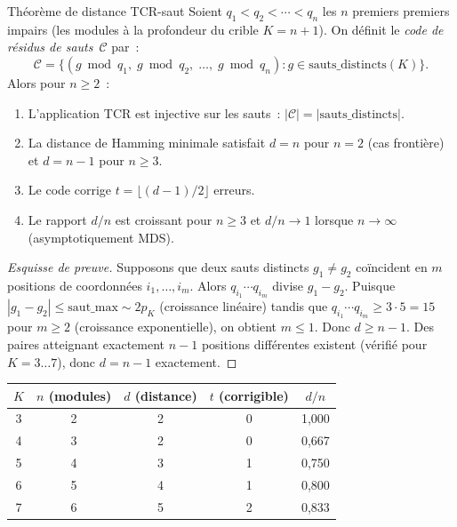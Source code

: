 \documentclass[12pt,a4paper]{article}
\begin{document}
\begin{thmbox}{Théorème de distance TCR-saut}
\label{thm:gap_distance}
Soient $q_1 < q_2 < \cdots < q_n$ les $n$ premiers premiers impairs
(les modules à la profondeur du crible $K = n+1$). On définit le
\emph{code de résidus de sauts}~$\mathcal{C}$ par~:
\[
  \mathcal{C} = \bigl\{
    (g \bmod q_1,\; g \bmod q_2,\; \ldots,\; g \bmod q_n)
    : g \in \mathrm{sauts\_distincts}(K)
  \bigr\}.
\]
Alors pour $n \geq 2$~:
\begin{enumerate}[nosep]
\item L'application TCR est injective sur les sauts~:
  $|\mathcal{C}| = |\mathrm{sauts\_distincts}|$.
\item La distance de Hamming minimale satisfait $d = n$ pour $n = 2$
  (cas frontière) et $d = n - 1$ pour $n \geq 3$.
\item Le code corrige $t = \lfloor(d-1)/2\rfloor$ erreurs.
\item Le rapport $d/n$ est croissant pour $n \geq 3$ et $d/n \to 1$
  lorsque $n \to \infty$ (asymptotiquement MDS).
\end{enumerate}
\end{thmbox}

\begin{proof}[Esquisse de preuve]
Supposons que deux sauts distincts $g_1 \neq g_2$ coïncident en $m$
positions de coordonnées $i_1, \ldots, i_m$. Alors
$q_{i_1} \cdots q_{i_m}$ divise $g_1 - g_2$. Puisque
$|g_1 - g_2| \leq \mathrm{saut}\_\mathrm{max}\sim 2p_K$ (croissance
linéaire) tandis que $q_{i_1} \cdots q_{i_m} \geq 3 \cdot 5 = 15$
pour $m \geq 2$ (croissance exponentielle), on obtient $m \leq 1$.
Donc $d \geq n - 1$. Des paires atteignant exactement $n - 1$
positions différentes existent (vérifié pour $K = 3 \ldots 7$), donc
$d = n - 1$ exactement.
\end{proof}

\begin{center}
\begin{tabular}{ccccc}
\toprule
$K$ & $n$ (modules) & $d$ (distance) & $t$ (corrigible) & $d/n$ \\
\midrule
3 & 2 & 2 & 0 & 1{,}000 \\
4 & 3 & 2 & 0 & 0{,}667 \\
5 & 4 & 3 & 1 & 0{,}750 \\
6 & 5 & 4 & 1 & 0{,}800 \\
7 & 6 & 5 & 2 & 0{,}833 \\
\bottomrule
\end{tabular}
\end{center}
\end{document}
